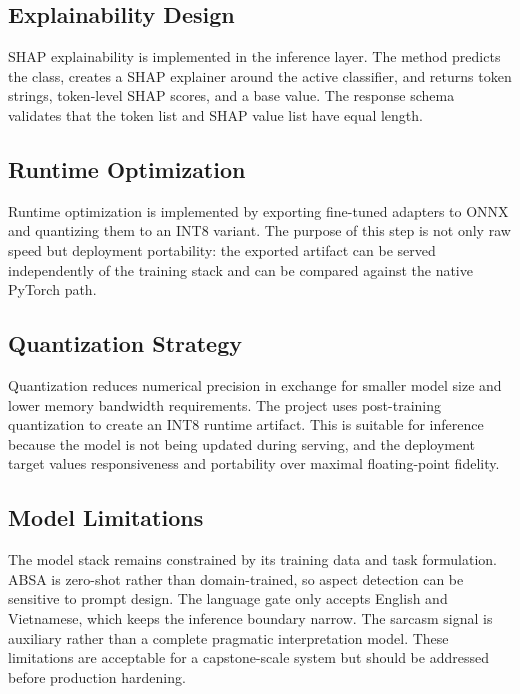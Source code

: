 \documentclass[12pt, a4paper]{article}
\begin{document}
\subsection{Explainability Design}
SHAP explainability is implemented in the inference layer. The method predicts the class, creates a SHAP explainer around the active classifier, and returns token strings, token-level SHAP scores, and a base value. The response schema validates that the token list and SHAP value list have equal length.

\subsection{Runtime Optimization}
Runtime optimization is implemented by exporting fine-tuned adapters to ONNX and quantizing them to an INT8 variant. The purpose of this step is not only raw speed but deployment portability: the exported artifact can be served independently of the training stack and can be compared against the native PyTorch path.

\subsection{Quantization Strategy}
Quantization reduces numerical precision in exchange for smaller model size and lower memory bandwidth requirements. The project uses post-training quantization to create an INT8 runtime artifact. This is suitable for inference because the model is not being updated during serving, and the deployment target values responsiveness and portability over maximal floating-point fidelity.

\subsection{Model Limitations}
The model stack remains constrained by its training data and task formulation. ABSA is zero-shot rather than domain-trained, so aspect detection can be sensitive to prompt design. The language gate only accepts English and Vietnamese, which keeps the inference boundary narrow. The sarcasm signal is auxiliary rather than a complete pragmatic interpretation model. These limitations are acceptable for a capstone-scale system but should be addressed before production hardening.
\end{document}

